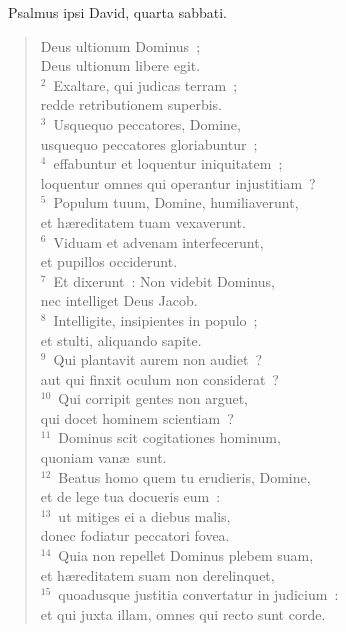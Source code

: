 ~\lettrine[lines=10,image=true,loversize=0.05,lraise=-0.03]{P}{}salmus ipsi David, quarta sabbati. \begin{flushleft}\begin{verse}\vspace{6pt}Deus ultionum Dominus~;\\ Deus ultionum libere egit.\\
${}^{2}$~Exaltare, qui judicas terram~;\\ redde retributionem superbis.\\
${}^{3}$~Usquequo peccatores, Domine,\\ usquequo peccatores gloriabuntur~;\\
${}^{4}$~effabuntur et loquentur iniquitatem~;\\ loquentur omnes qui operantur injustitiam~?\\
${}^{5}$~Populum tuum, Domine, humiliaverunt,\\ et h\ae reditatem tuam vexaverunt.\\
${}^{6}$~Viduam et advenam interfecerunt,\\ et pupillos occiderunt.\\
${}^{7}$~Et dixerunt~: Non videbit Dominus,\\ nec intelliget Deus Jacob.\\
${}^{8}$~Intelligite, insipientes in populo~;\\ et stulti, aliquando sapite.\\
${}^{9}$~Qui plantavit aurem non audiet~?\\ aut qui finxit oculum non considerat~?\\
${}^{10}$~Qui corripit gentes non arguet,\\ qui docet hominem scientiam~?\\
${}^{11}$~Dominus scit cogitationes hominum,\\ quoniam van\ae\ sunt.\\
${}^{12}$~Beatus homo quem tu erudieris, Domine,\\ et de lege tua docueris eum~:\\
${}^{13}$~ut mitiges ei a diebus malis,\\ donec fodiatur peccatori fovea.\\
${}^{14}$~Quia non repellet Dominus plebem suam,\\ et h\ae reditatem suam non derelinquet,\\
${}^{15}$~quoadusque justitia convertatur in judicium~:\\ et qui juxta illam, omnes qui recto sunt corde.\\

\end{verse}
\end{flushleft}
